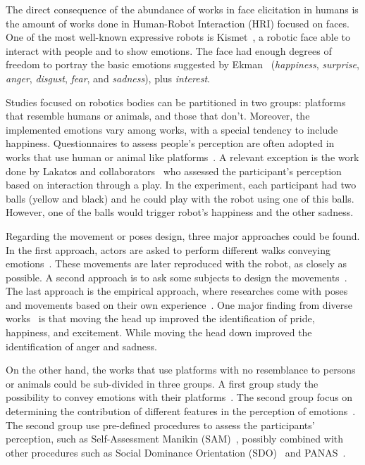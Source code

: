The direct consequence of the abundance of works in face elicitation in humans is the amount of works done in Human-Robot Interaction (HRI) focused on faces. One of the most well-known expressive robots is Kismet~\cite{Breazeal2002}, a robotic face able to interact with people and to show emotions. The face had enough degrees of freedom to portray the basic emotions suggested by Ekman~\cite{Ekman2004} (\textit{happiness}, \textit{surprise}, \textit{anger}, \textit{disgust}, \textit{fear}, and \textit{sadness}), plus \textit{interest}.

Studies focused on robotics bodies can be partitioned in two groups: platforms that resemble humans or animals, and those that don't. Moreover, the implemented emotions vary among works, with a special tendency to include happiness. Questionnaires to assess people's perception are often adopted in works that use human or animal like platforms~\cite{Canamero2010,Beck2010,Li2011,Destephe2013b,Arras2012,Brown2014}. A relevant exception is the work done by Lakatos and collaborators~\cite{Lakatos2014} who assessed the participant's perception based on interaction through a play. In the experiment, each participant had two balls (yellow and black) and he could play with the robot using one of this balls. However, one of the balls would trigger robot's happiness and the other sadness. 

Regarding the movement or poses design, three major approaches could be found. In the first approach, actors are asked to perform different walks conveying emotions~\cite{Destephe2013b}. These movements are later reproduced with the robot, as closely as possible. A second approach is to ask some subjects to design the movements~\cite{Li2011}. The last approach is the empirical approach, where researches come with poses and movements based on their own experience~\cite{Canamero2010,Beck2010,Arras2012,Brown2014}. One major finding from diverse works~\cite{Canamero2010,Beck2010,Brown2014} is that moving the head up improved the identification of pride, happiness, and excitement. While moving the head down improved the identification of anger and sadness.

On the other hand, the works that use platforms with no resemblance to persons or animals could be sub-divided in three groups. A first group study the possibility to convey emotions with their platforms~\cite{Arras2012, Novika2015, BarakovaL10}. The second group focus on determining the contribution of different features in the perception of emotions~\cite{Saerbeck2010,Barakova2013, Sharma2013, NAM2014}.
The second group use pre-defined procedures to assess the participants' perception, such as Self-Assessment Manikin (SAM)~\cite{Lang2008}, possibly combined  with other procedures such as Social Dominance Orientation (SDO)~\cite{pratto1994social} and PANAS~\cite{WatsonClarkTellegen88}. 

